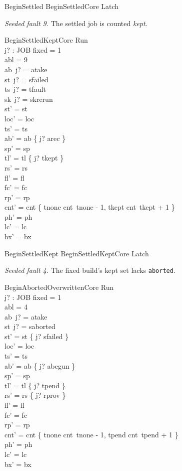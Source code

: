 \documentclass[a4paper,10pt,fleqn]{article}
\newcommand{\field}[1]{\texttt{#1}}
\begin{document}
\begin{zed}
BeginSettled  BeginSettledCore \land Latch
\end{zed}

\emph{Seeded fault 9.} The settled job is counted \emph{kept}.

\begin{schema}{BeginSettledKeptCore}
\Delta Run \\ j? : JOB
\where
fixed = 1 \\
abl = 9 \\
ab~j? = atake \\
st~j? = sfailed \\
ts~j? = tfault \\
sk~j? = skrerun \\
st' = st \\
loc' = loc \\
ts' = ts \\
ab' = ab \oplus \{ j? \mapsto arec \} \\
sp' = sp \\
tl' = tl \oplus \{ j? \mapsto tkept \} \\
rs' = rs \\
fl' = fl \\
fc' = fc \\
rp' = rp \\
cnt' = cnt \oplus \{ tnone \mapsto cnt~tnone - 1, tkept \mapsto cnt~tkept + 1 \} \\
ph' = ph \\
lc' = lc \\
bx' = bx
\end{schema}

\begin{zed}
BeginSettledKept  BeginSettledKeptCore \land Latch
\end{zed}

\emph{Seeded fault 4.} The fixed build's kept set lacks \field{aborted}.

\begin{schema}{BeginAbortedOverwrittenCore}
\Delta Run \\ j? : JOB
\where
fixed = 1 \\
abl = 4 \\
ab~j? = atake \\
st~j? = saborted \\
st' = st \oplus \{ j? \mapsto sfailed \} \\
loc' = loc \\
ts' = ts \\
ab' = ab \oplus \{ j? \mapsto abegun \} \\
sp' = sp \\
tl' = tl \oplus \{ j? \mapsto tpend \} \\
rs' = rs \oplus \{ j? \mapsto rprov \} \\
fl' = fl \\
fc' = fc \\
rp' = rp \\
cnt' = cnt \oplus \{ tnone \mapsto cnt~tnone - 1, tpend \mapsto cnt~tpend + 1 \} \\
ph' = ph \\
lc' = lc \\
bx' = bx
\end{schema}
\end{document}
